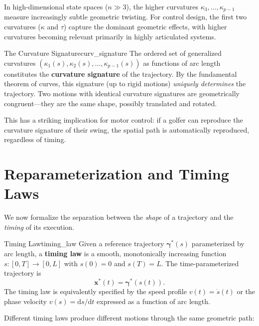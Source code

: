 \documentclass[12pt, openany]{book}
\theoremstyle{plain}
\newcommand{\state}{\bm{x}}
\newcommand{\traj}{\bm{\gamma}}
\newcommand{\dd}{\mathrm{d}}
\begin{document}
In high-dimensional state spaces ($n \gg 3$), the higher curvatures
$\kappa_3, \ldots, \kappa_{p-1}$ measure increasingly subtle geometric
twisting. For control design, the first two curvatures ($\kappa$ and $\tau$)
capture the dominant geometric effects, with higher curvatures becoming
relevant primarily in highly articulated systems.

\begin{remark}{The Curvature Signature}{curv_signature}
  The ordered set of generalized curvatures $(\kappa_1(s), \kappa_2(s),
  \ldots, \kappa_{p-1}(s))$ as functions of arc length constitutes the
  \textbf{curvature signature} of the trajectory. By the fundamental theorem
  of curves, this signature (up to rigid motions) \emph{uniquely determines}
  the trajectory. Two motions with identical curvature signatures are
  geometrically congruent---they are the same shape, possibly translated
  and rotated.

  This has a striking implication for motor control: if a golfer can reproduce
  the curvature signature of their swing, the spatial path is automatically
  reproduced, regardless of timing.
\end{remark}

\section{Reparameterization and Timing Laws}

We now formalize the separation between the \emph{shape} of a trajectory and
the \emph{timing} of its execution.

\begin{definition}{Timing Law}{timing_law}
  Given a reference trajectory $\traj^*(s)$ parameterized by arc length, a
  \textbf{timing law} is a smooth, monotonically increasing function
  $s: [0, T] \to [0, L]$ with $s(0) = 0$ and $s(T) = L$. The
  time-parameterized trajectory is
  \begin{equation}
    \state^*(t) = \traj^*(s(t)).
  \end{equation}
  The timing law is equivalently specified by the speed profile $v(t) = \dot{s}(t)$
  or the phase velocity $v(s) = \dd s / \dd t$ expressed as a function of arc
  length.
\end{definition}

Different timing laws produce different motions through the same geometric
path:
\end{document}
